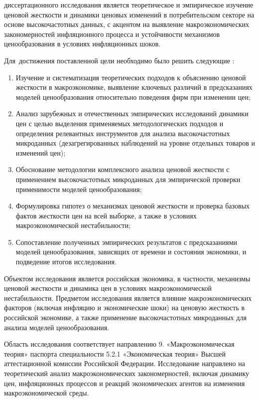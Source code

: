 {\aim} диссертационного исследования является теоретическое и эмпирическое изучение ценовой жесткости и динамики ценовых изменений в потребительском секторе на основе высокочастотных данных, с акцентом на выявление макроэкономических закономерностей инфляционного процесса и устойчивости механизмов ценообразования в условиях инфляционных шоков.

Для~достижения поставленной цели необходимо было решить следующие {\tasks}:
\begin{enumerate}[beginpenalty=10000] %
  \item Изучение и систематизация теоретических подходов к объяснению ценовой жесткости в макроэкономике, выявление ключевых различий в предсказаниях моделей ценообразования относительно поведения фирм при изменении цен;
  \item Анализ зарубежных и отечественных эмпирических исследований динамики цен с целью выделения применяемых методологических подходов и определения релевантных инструментов для анализа высокочастотных микроданных (дезагрегированных наблюдений на уровне отдельных товаров и изменений цен);
  \item Обоснование методологии комплексного анализа ценовой жесткости с применением высокочастотных микроданных для эмпирической проверки применимости моделей ценообразования;
  \item Формулировка гипотез о механизмах ценовой жесткости и проверка базовых фактов жесткости цен на всей выборке, а также в условиях макроэкономической нестабильности;
  \item Сопоставление полученных эмпирических результатов с предсказаниями моделей ценообразования, зависящих от времени и состояния экономики, и подведение итогов исследования.
\end{enumerate}


{\object} Объектом исследования является российская экономика, в частности, механизмы ценовой жесткости и динамика цен в условиях макроэкономической нестабильности. Предметом исследования является влияние макроэкономических факторов (включая инфляцию и экономические шоки) на ценовую жесткость в российской экономике, а также применение высокочастотных микроданных для анализа моделей ценообразования.

{\field} Область исследования соответствует направлению 9. «Макроэкономическая теория» паспорта специальности 5.2.1 «Экономическая теория» Высшей аттестационной комиссии Российской Федерации. Исследование направлено на теоретический анализ макроэкономических закономерностей, включая динамику цен, инфляционных процессов и реакций экономических агентов на изменения макроэкономической среды.

